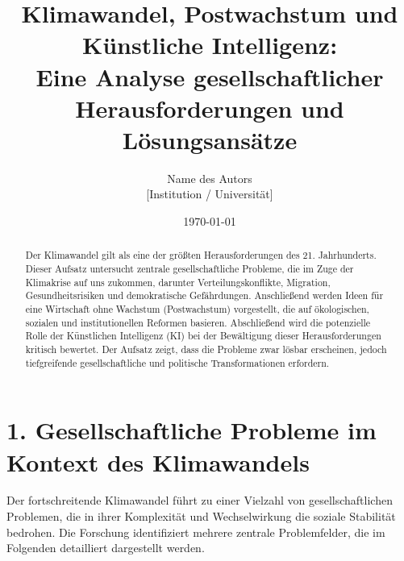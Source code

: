 \documentclass[12pt, a4paper]{article}
\title{
	\vspace{2cm}
	Klimawandel, Postwachstum und Künstliche Intelligenz: \\
	Eine Analyse gesellschaftlicher Herausforderungen und Lösungsansätze
}
\author{
	\vspace{0.5cm}
	\Large Name des Autors \\
	\normalsize [Institution / Universität] \\
	\vspace{0.5cm}
}
\date{\today}
\begin{document}
	
	\maketitle
	
	\vspace{0.5cm}
	\begin{abstract}
		\noindent
		Der Klimawandel gilt als eine der größten Herausforderungen des 21. Jahrhunderts.
		Dieser Aufsatz untersucht zentrale gesellschaftliche Probleme, die im Zuge der
		Klimakrise auf uns zukommen, darunter Verteilungskonflikte, Migration,
		Gesundheitsrisiken und demokratische Gefährdungen. Anschließend werden Ideen für eine
		Wirtschaft ohne Wachstum (Postwachstum) vorgestellt, die auf ökologischen,
		sozialen und institutionellen Reformen basieren. Abschließend wird die potenzielle
		Rolle der Künstlichen Intelligenz (KI) bei der Bewältigung dieser Herausforderungen
		kritisch bewertet. Der Aufsatz zeigt, dass die Probleme zwar lösbar erscheinen,
		jedoch tiefgreifende gesellschaftliche und politische Transformationen erfordern.
	\end{abstract}
	\vspace{0.8cm}
	
	\section*{1. Gesellschaftliche Probleme im Kontext des Klimawandels}
	
	Der fortschreitende Klimawandel führt zu einer Vielzahl von gesellschaftlichen
	Problemen, die in ihrer Komplexität und Wechselwirkung die soziale Stabilität
	bedrohen. Die Forschung identifiziert mehrere zentrale Problemfelder, die im Folgenden
	detailliert dargestellt werden.
	
\end{document}
